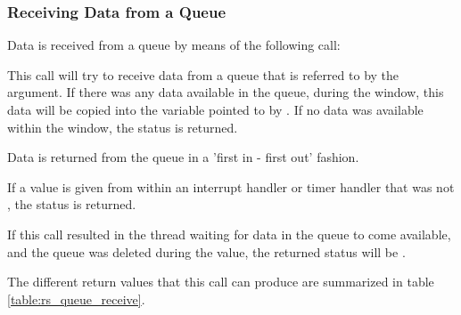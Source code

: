 \subsubsection{Receiving Data from a Queue}

Data is received from a queue by means of the following call:


This call will try to receive data from a queue that is referred to by the
 argument. If there was any data available in the queue, during the
 window, this data will
be copied into the variable pointed to by . If no data was available within the
 window, the status  is returned. 

Data is returned from the queue in a 'first in - first out' fashion.

If a  value is given from within an interrupt handler or timer handler that was not
, the status  is returned.

If this call resulted in the thread waiting for
data in the queue to come available, and the queue was deleted during the
 value, the returned status will be .

The different return values that this call can produce are summarized in
table \ref{table:rs_queue_receive}.


